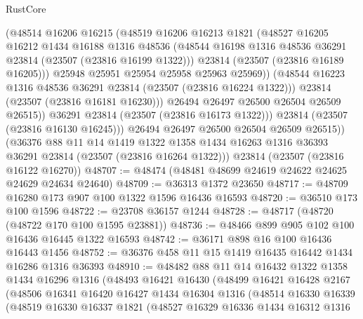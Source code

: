 \begin{lexlean}{RustCore}
\begin{coremodule}
                  (@48514
                    @16206
                    @16215
                    (@48519
                      @16206
                      @16213
                      @1821
                      (@48527
                        @16205
                        @16212
                        @1434
                        @16188
                        @1316
                        @48536
                        (@48544 @16198 @1316 @48536 @36291 @23814 (@23507 (@23816 @16199 @1322)))
                        @23814
                        (@23507 (@23816 @16189 @16205)))
                      @25948
                      @25951
                      @25954
                      @25958
                      @25963
                      @25969))
                  (@48544 @16223 @1316 @48536 @36291 @23814 (@23507 (@23816 @16224 @1322)))
                  @23814
                  (@23507 (@23816 @16181 @16230)))
                @26494
                @26497
                @26500
                @26504
                @26509
                @26515))
            @36291
            @23814
            (@23507 (@23816 @16173 @1322)))
          @23814
          (@23507 (@23816 @16130 @16245)))
        @26494
        @26497
        @26500
        @26504
        @26509
        @26515))
    (@36376
      @88
      @11
      @14
      @1419
      @1322
      @1358
      @1434
      @16263
      @1316
      @36393
      @36291
      @23814
      (@23507 (@23816 @16264 @1322)))
    @23814
    (@23507 (@23816 @16122 @16270))
@48707 := @48474 (@48481 @48699 @24619 @24622 @24625 @24629 @24634 @24640)
@48709 := @36313 @1372 @23650
@48717 := @48709 @16280 @173 @907 @100 @1322 @1596 @16436 @16593
@48720 := @36510 @173 @100 @1596
@48722 := @23708 @36157 @1244
@48728 := @48717 (@48720 (@48722 @170 @100 @1595 @23881))
@48736 := @48466 @899 @905 @102 @100 @16436 @16445 @1322 @16593
@48742 := @36171 @898 @16 @100 @16436 @16443 @1456
@48752 := @36376 @458 @11 @15 @1419 @16435 @16442 @1434 @16286 @1316 @36393
@48910 := @48482
    @88
    @11
    @14
    @16432
    @1322
    @1358
    @1434
    @16296
    @1316
    (@48493
      @16421
      @16430
      (@48499
        @16421
        @16428
        @2167
        (@48506
          @16341
          @16420
          @16427
          @1434
          @16304
          @1316
          (@48514
            @16330
            @16339
            (@48519
              @16330
              @16337
              @1821
              (@48527
                @16329
                @16336
                @1434
                @16312
                @1316

\end{coremodule}
\end{lexlean}
